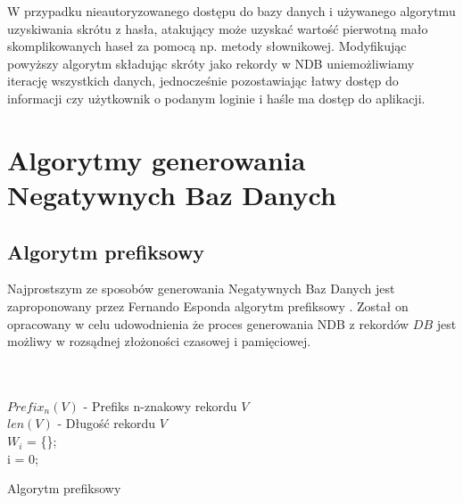 W przypadku nieautoryzowanego dostępu do bazy danych i używanego algorytmu uzyskiwania skrótu z hasła, atakujący może uzyskać 
wartość pierwotną mało skomplikowanych haseł za pomocą np. metody słownikowej. Modyfikując powyższy algorytm 
składując skróty jako rekordy w NDB uniemożliwiamy iterację wszystkich danych, jednocześnie pozostawiając
łatwy dostęp do informacji czy użytkownik o podanym loginie i haśle ma dostęp do aplikacji.

\section{Algorytmy generowania Negatywnych Baz Danych}
\subsection{Algorytm prefiksowy}
Najprostszym ze sposobów generowania Negatywnych Baz Danych jest zaproponowany przez Fernando Esponda algorytm prefiksowy \cite{NRI-Esponda, Esponda2004EnhancingPT}. Został on opracowany w celu udowodnienia że proces generowania NDB z rekordów $DB$ jest możliwy w rozsądnej złożoności czasowej i pamięciowej.
\\\\\\
\begin{algorithm}[H]
    \SetAlgoLined
    
    $Prefix_n(V)$ - Prefiks n-znakowy rekordu $V$\\
    $len(V)$ - Długość rekordu $V$\\
    $W_i$ = \{\};\\
    i = 0;\\
    
    \caption{Algorytm prefiksowy}
    \label{alg:prefix}
\end{algorithm}
~\\\\

